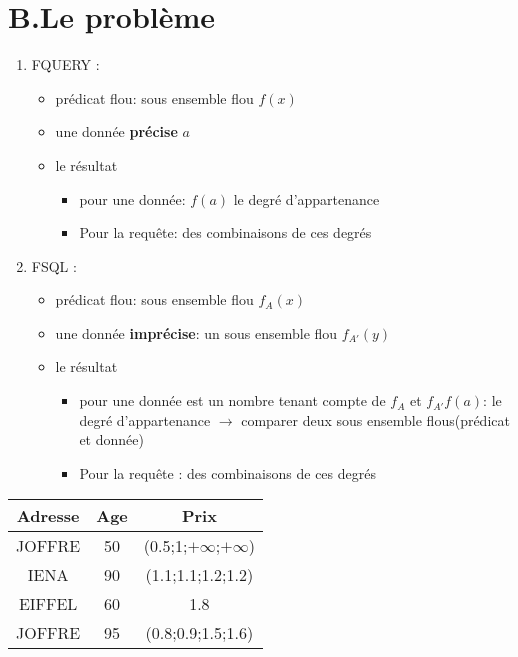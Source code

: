 \documentclass[a4paper,11pt]{article}
\begin{document}
\section{B.Le problème}

\begin{enumerate}
\item FQUERY : \\
	\begin{itemize}
	\item prédicat flou: sous ensemble flou $f(x)$
	\item une donnée \textbf{précise} $a$
	\item le résultat
	\begin{itemize}
		\item pour une donnée: $f(a)$ le degré d’appartenance
		\item Pour la requête: des combinaisons de ces degrés
	\end{itemize}		
\end{itemize}

\item FSQL : \\
	\begin{itemize}
	\item prédicat flou: sous ensemble flou $f_A(x)$
	\item une donnée \textbf{imprécise}: un sous ensemble flou $f_{A'}(y)$
	\item le résultat
	\begin{itemize}
		\item pour une donnée est un nombre tenant compte de $f_A$ et $f_{A'} f(a)$: le degré d'appartenance $\rightarrow$ comparer deux sous ensemble flous(prédicat et donnée) 
		\item Pour la requête : des combinaisons de ces degrés
	\end{itemize}		
\end{itemize}
\end{enumerate}

\begin{center}
\begin{tabular}{|c|c|c|}
\hline 
Adresse & Age & Prix \\ 
\hline 
JOFFRE & 50 & (0.5;1;$+\infty$;$+\infty$) \\ 
\hline 
IENA & 90 & (1.1;1.1;1.2;1.2) \\ 
\hline 
EIFFEL & 60 & 1.8 \\ 
\hline 
JOFFRE & 95 & (0.8;0.9;1.5;1.6) \\ 
\hline 
\end{tabular} 
\end{center}
\end{document}
